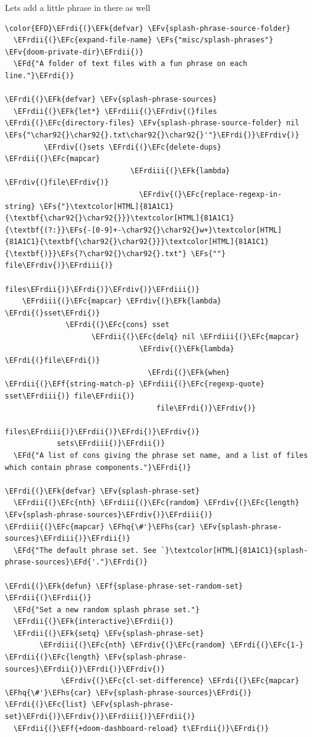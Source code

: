 \documentclass{scrartcl}
\newcommand{\EFk}[1]{\textcolor{EFk}{#1}} %
\newcommand{\EFd}[1]{\textcolor{EFd}{#1}} %
\newcommand{\EFs}[1]{\textcolor{EFs}{#1}} %
\newcommand{\EFc}[1]{\textcolor{EFc}{#1}} %
\newcommand{\EFv}[1]{\textcolor{EFv}{#1}} %
\newcommand{\EFf}[1]{\textcolor{EFf}{#1}} %
\newcommand{\EFhq}[1]{#1} %
\newcommand{\EFhs}[1]{#1} %
\newcommand{\EFrdi}[1]{#1} %
\newcommand{\EFrdii}[1]{#1} %
\newcommand{\EFrdiii}[1]{#1} %
\newcommand{\EFrdiv}[1]{#1} %
\begin{document}
Lets add a little phrase in there as well
\begin{Code}
\begin{Verbatim}[]
\color{EFD}\EFrdi{(}\EFk{defvar} \EFv{splash-phrase-source-folder}
  \EFrdii{(}\EFc{expand-file-name} \EFs{"misc/splash-phrases"} \EFv{doom-private-dir}\EFrdii{)}
  \EFd{"A folder of text files with a fun phrase on each line."}\EFrdi{)}

\EFrdi{(}\EFk{defvar} \EFv{splash-phrase-sources}
  \EFrdii{(}\EFk{let*} \EFrdiii{(}\EFrdiv{(}files \EFrdi{(}\EFc{directory-files} \EFv{splash-phrase-source-folder} nil \EFs{"\char92{}\char92{}.txt\char92{}\char92{}'"}\EFrdi{)}\EFrdiv{)}
         \EFrdiv{(}sets \EFrdi{(}\EFc{delete-dups} \EFrdii{(}\EFc{mapcar}
                             \EFrdiii{(}\EFk{lambda} \EFrdiv{(}file\EFrdiv{)}
                               \EFrdiv{(}\EFc{replace-regexp-in-string} \EFs{"}\textcolor[HTML]{81A1C1}{\textbf{\char92{}\char92{}}}\textcolor[HTML]{81A1C1}{\textbf{(?:}}\EFs{-[0-9]+-\char92{}\char92{}w+}\textcolor[HTML]{81A1C1}{\textbf{\char92{}\char92{}}}\textcolor[HTML]{81A1C1}{\textbf{)}}\EFs{?\char92{}\char92{}.txt"} \EFs{""} file\EFrdiv{)}\EFrdiii{)}
                             files\EFrdii{)}\EFrdi{)}\EFrdiv{)}\EFrdiii{)}
    \EFrdiii{(}\EFc{mapcar} \EFrdiv{(}\EFk{lambda} \EFrdi{(}sset\EFrdi{)}
              \EFrdi{(}\EFc{cons} sset
                    \EFrdii{(}\EFc{delq} nil \EFrdiii{(}\EFc{mapcar}
                               \EFrdiv{(}\EFk{lambda} \EFrdi{(}file\EFrdi{)}
                                 \EFrdi{(}\EFk{when} \EFrdii{(}\EFf{string-match-p} \EFrdiii{(}\EFc{regexp-quote} sset\EFrdiii{)} file\EFrdii{)}
                                   file\EFrdi{)}\EFrdiv{)}
                               files\EFrdiii{)}\EFrdii{)}\EFrdi{)}\EFrdiv{)}
            sets\EFrdiii{)}\EFrdii{)}
  \EFd{"A list of cons giving the phrase set name, and a list of files which contain phrase components."}\EFrdi{)}

\EFrdi{(}\EFk{defvar} \EFv{splash-phrase-set}
  \EFrdii{(}\EFc{nth} \EFrdiii{(}\EFc{random} \EFrdiv{(}\EFc{length} \EFv{splash-phrase-sources}\EFrdiv{)}\EFrdiii{)} \EFrdiii{(}\EFc{mapcar} \EFhq{\#'}\EFhs{car} \EFv{splash-phrase-sources}\EFrdiii{)}\EFrdii{)}
  \EFd{"The default phrase set. See `}\textcolor[HTML]{81A1C1}{splash-phrase-sources}\EFd{'."}\EFrdi{)}

\EFrdi{(}\EFk{defun} \EFf{splase-phrase-set-random-set} \EFrdii{(}\EFrdii{)}
  \EFd{"Set a new random splash phrase set."}
  \EFrdii{(}\EFk{interactive}\EFrdii{)}
  \EFrdii{(}\EFk{setq} \EFv{splash-phrase-set}
        \EFrdiii{(}\EFc{nth} \EFrdiv{(}\EFc{random} \EFrdi{(}\EFc{1-} \EFrdii{(}\EFc{length} \EFv{splash-phrase-sources}\EFrdii{)}\EFrdi{)}\EFrdiv{)}
             \EFrdiv{(}\EFc{cl-set-difference} \EFrdi{(}\EFc{mapcar} \EFhq{\#'}\EFhs{car} \EFv{splash-phrase-sources}\EFrdi{)} \EFrdi{(}\EFc{list} \EFv{splash-phrase-set}\EFrdi{)}\EFrdiv{)}\EFrdiii{)}\EFrdii{)}
  \EFrdii{(}\EFf{+doom-dashboard-reload} t\EFrdii{)}\EFrdi{)}


\end{Verbatim}
\end{Code}
\end{document}
